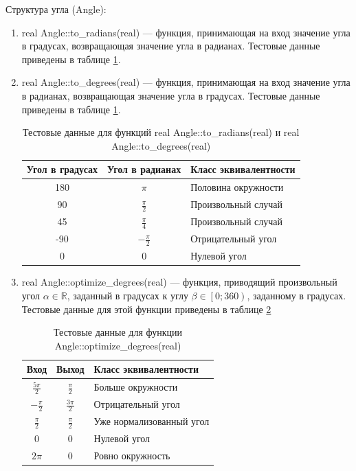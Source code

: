 Структура угла (Angle):
\begin{enumerate}
	\item real Angle::to\_radians(real) --- функция, принимающая на вход значение угла в градусах, возвращающая значение угла в радианах. Тестовые данные приведены в таблице \ref{tbl:to_radians}.
	\item real Angle::to\_degrees(real) --- функция, принимающая на вход значение угла в радианах, возвращающая значение угла в градусах. Тестовые данные приведены в таблице \ref{tbl:to_radians}.
	\begin{table}[!ht]
		\centering
		\caption{Тестовые данные для функций real Angle::to\_radians(real) и real Angle::to\_degrees(real)}
		\label{tbl:to_radians}
		\begin{tabular}{|c|c|l|}
			\hline
			Угол в градусах & Угол в радианах & Класс эквивалентности \\
			\hline
			180	& $\pi$	& Половина окружности \\
			90	& $\frac{\pi}{2}$ & Произвольный случай \\
			45	& $\frac{\pi}{4}$ & Произвольный случай \\
			-90 & $-\frac{\pi}{2}$ & Отрицательный угол \\
			0	& 0 & Нулевой угол \\
			\hline
		\end{tabular}
	\end{table}
	
	\item real Angle::optimize\_degrees(real) --- функция, приводящий произвольный угол $\alpha\in\mathbb{R}$, заданный в градусах к углу $\beta\in\left[0; 360\right)$, заданному в градусах. Тестовые данные для этой функции приведены в таблице \ref{tbl:optimize_radians}
	\begin{table}[!ht]
		\centering
		\caption{Тестовые данные для функции Angle::optimize\_degrees(real)}
		\label{tbl:optimize_radians}
		\begin{tabular}{|c|c|l|}
			\hline
			Вход & Выход & Класс эквивалентности \\
			\hline
			$\frac{5\pi}{2}$ & $\frac{\pi}{2}$ & Больше окружности \\
			$-\frac{\pi}{2}$ & $\frac{3\pi}{2}$	& Отрицательный угол \\
			$\frac{\pi}{2}$ & $\frac{\pi}{2}$ & Уже нормализованный угол \\
			$0$ & $0$ & Нулевой угол\\
			$2\pi$ & $0$ & Ровно окружность\\
			\hline
		\end{tabular}
	\end{table}
	

\end{enumerate}
